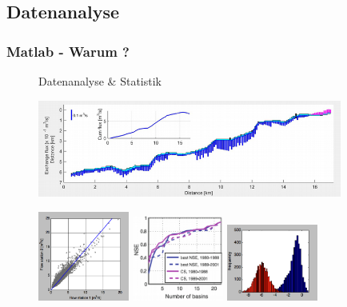    \subsection{Datenanalyse}
    \begin{frame}
      \frametitle{Matlab - Warum ?}

      \vspace{-0.8cm}

      \begin{figure}
        Datenanalyse \& Statistik \par \vspace{0.4cm}
        \includegraphics[width=10.0cm]{visualisierung2.png}
      \end{figure}

      \vspace{-0.5cm}

      \begin{figure}
        \includegraphics[width=3.0cm]{visualisierung3.png}
        \hspace{0.5cm}
        \includegraphics[width=3.0cm]{visualisierung5.png}
        \hspace{0.5cm}
        \includegraphics[width=3.0cm]{visualisierung4.png}
      \end{figure}
    \end{frame}

